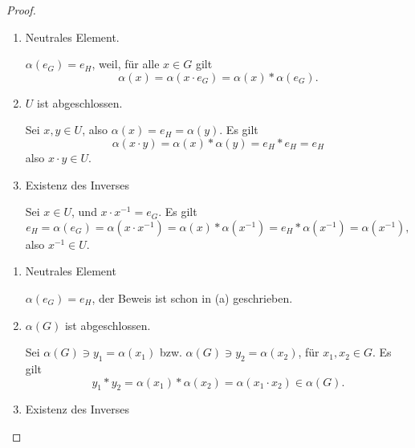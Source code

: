 \begin{proof}
	\begin{parts}
	\item 
		\begin{enumerate}[label=(\roman*)]
			\item Neutrales Element.

				$\alpha(e_G)=e_H$, weil, f\"{u}r alle $x\in G$ gilt
				\[
				\alpha(x)=\alpha(x\cdot e_G)=\alpha(x)*\alpha(e_G)
				.\] 
			\item $U$ ist abgeschlossen.

Sei $x,y\in U$, also $\alpha(x)=e_H=\alpha(y)$. Es gilt
\[
\alpha(x\cdot y)=\alpha(x)*\alpha(y)=e_H*e_H=e_H\]
also $x\cdot y\in U$.
\item Existenz des Inverses

	Sei  $x\in U$, und $x\cdot x^{-1}=e_G$. Es gilt
	 \[
		 e_H=\alpha(e_G)=\alpha(x\cdot x^{-1})=\alpha(x)* \alpha\left( x^{-1} \right)=e_H*\alpha\left( x^{-1} \right)  =\alpha\left( x^{-1} \right) 
	,\] 
	also $x^{-1}\in U$.
		\end{enumerate}
	\item 
		\begin{enumerate}
			\item Neutrales Element

				$\alpha(e_G)=e_H$, der Beweis ist schon in (a) geschrieben.
			\item $\alpha(G)$ ist abgeschlossen.

				Sei $\alpha(G)\ni y_1=\alpha(x_1)$ bzw. $\alpha(G)\ni y_2=\alpha(x_2)$, f\"{u}r $x_1,x_2\in G$. Es gilt
				\[
				y_1*y_2=\alpha(x_1)*\alpha(x_2)=\alpha(x_1\cdot x_2)\in \alpha(G)
				.\] 
			\item Existenz des Inverses


\end{enumerate}
\end{parts}
\end{proof}
